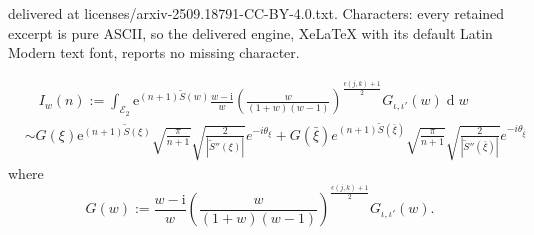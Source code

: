 \documentclass[10pt,a4paper]{amsart}
\newcommand{\io}{{\iota}}
\newcommand{\tS}{{\widetilde S}}
\begin{document}
delivered at licenses/arxiv-2509.18791-CC-BY-4.0.txt. Characters: every retained excerpt is pure ASCII, so the delivered engine, XeLaTeX with its default Latin Modern text font, reports no missing character.
\begin{lemma}
    \label{lemma: steepest_descent_lemma}
    \begin{equation}
      \label{eq: asymptotic of w integral 
}
\begin{aligned}
&\quad I_w(n):=\int_{\mathcal{E}_2}\mathrm e^{(n+1)\tS(w)}\frac{w-\mathrm i}{w}\left (\frac{w}{(1+w)(w-1)}\right )^{\frac{\epsilon(j,k)+1}{2}} G_{\io,\io'}(w)\operatorname{d}w\\
        &\sim G(\xi)\mathrm e^{(n+1) \tS(\xi)}\sqrt{\frac{\pi}{n+1}}\sqrt{\frac{2}{|\tS''(\xi)|}}e^{-i\theta_\xi}+G(\bar \xi)e^{(n+1) \tS(\bar \xi)}\sqrt{\frac{\pi}{n+1}}\sqrt{\frac{2}{|\tS''(\bar \xi)|}}e^{-i\theta_{\bar \xi}}
\end{aligned}
    \end{equation}
where $$G(w):=\frac{w-\mathrm i}{w}\left (\frac{w}{(1+w)(w-1)}\right )^{\frac{\epsilon(j,k)+1}{2}}  G_{\io,\io'}(w).$$
\end{lemma}
\end{document}
